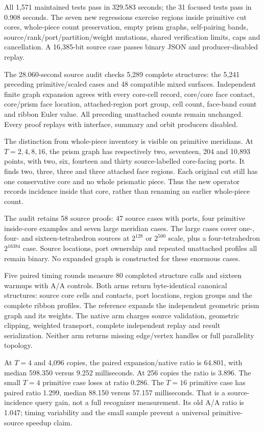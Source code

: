 All 1,571 maintained tests pass in 329.583 seconds; the 31 focused tests
pass in 0.908 seconds. The seven new regressions exercise regions inside
primitive cut cores, whole-piece count preservation, empty prism graphs,
self-pairing bands, source/rank/port/partition/weight mutations, shared
verification limits, caps and cancellation. A 16,385-bit source case passes
binary JSON and producer-disabled replay.

The 28.060-second source audit checks 5,289 complete structures: the 5,241
preceding primitive/scaled cases and 48 compatible mixed surfaces. Independent
finite graph expansion agrees with every core-cell record, core/core face
contact, core/prism face location, attached-region port group, cell count,
face-band count and ribbon Euler value. All preceding unattached counts
remain unchanged. Every proof replays with interface, summary and orbit
producers disabled.

The distinction from whole-piece inventory is visible on primitive meridians.
At $T=2,4,8,16$, the prism graph has respectively two, seventeen, 204 and
10,893 points, with two, six, fourteen and thirty source-labelled core-facing
ports. It finds two, three, three and three attached face regions. Each
original cut still has one conservative core and no whole prismatic piece.
Thus the new operator records incidence inside that core, rather than
renaming an earlier whole-piece count.

The audit retains 58 source proofs: 47 source cases with ports, four
primitive inside-core examples and seven large meridian cases. The large
cases cover one-, four- and sixteen-tetrahedron sources at $2^{128}$ or
$2^{500}$ scale, plus a four-tetrahedron $2^{16384}$ case. Source locations,
port ownership and repeated unattached profiles all remain binary. No
expanded graph is constructed for these enormous cases.

Five paired timing rounds measure 80 completed structure calls and sixteen
warmups with A/A controls. Both arms return byte-identical canonical
structures: source core cells and contacts, port locations, region groups
and the complete ribbon profiles. The reference expands the independent
geometric prism graph and its weights. The native arm charges source
validation, geometric clipping, weighted transport, complete independent
replay and result serialization. Neither arm returns missing edge/vertex
handles or full parallelity topology.


At $T=4$ and 4,096 copies, the paired expansion/native ratio is 64.801,
with median 598.350 versus 9.252 milliseconds. At 256 copies the ratio is
3.896. The small $T=4$ primitive case loses at ratio 0.286. The $T=16$
primitive case has paired ratio 1.299, median 88.150 versus 57.157
milliseconds. That is a source-incidence query gain, not a full recognizer
measurement. Its old A/A ratio is 1.047; timing variability and the small
sample prevent a universal primitive-source speedup claim.


